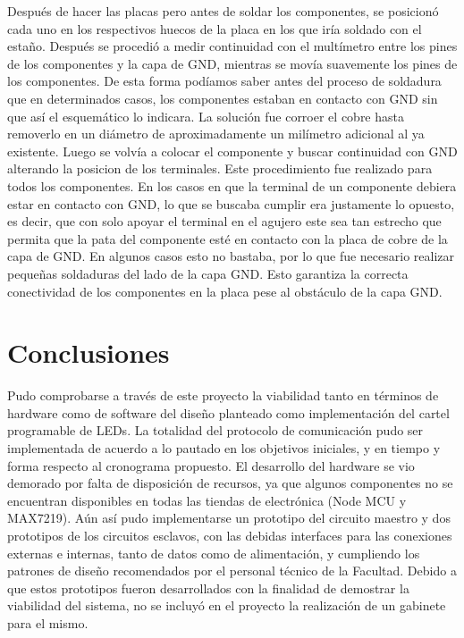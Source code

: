 Después de hacer las placas pero antes de soldar los componentes, se posicionó cada uno en los respectivos huecos de la placa en los que iría soldado con el estaño. Después se procedió a medir continuidad con el multímetro entre los pines de los componentes y la capa de GND, mientras se movía suavemente los pines de los componentes. De esta forma podíamos saber antes del proceso de soldadura que en determinados casos, los componentes estaban en contacto con GND sin que así el esquemático lo indicara. La solución fue corroer el cobre hasta removerlo en un diámetro de aproximadamente un milímetro adicional al ya existente. Luego se volvía a colocar el componente y buscar continuidad con GND alterando la posicion de los terminales. Este procedimiento fue realizado para todos los componentes. En los casos en que la terminal de un componente debiera estar en contacto con GND, lo que se buscaba cumplir era justamente lo opuesto, es decir, que con solo apoyar el terminal en el agujero este sea tan estrecho que permita que la pata del componente esté en contacto con la placa de cobre de la capa de GND. En algunos casos esto no bastaba, por lo que fue necesario realizar pequeñas soldaduras del lado de la capa GND. Esto garantiza la correcta conectividad de los componentes en la placa pese al obstáculo de la capa GND.

\section{Conclusiones}

Pudo comprobarse a través de este proyecto la viabilidad tanto en términos de hardware como de software del diseño planteado como implementación del cartel programable de LEDs. 
La totalidad del protocolo de comunicación pudo ser implementada de acuerdo a lo pautado en los objetivos iniciales, y en tiempo y forma respecto al cronograma propuesto. El desarrollo del hardware se vio demorado por falta de disposición de recursos, ya que algunos componentes no se encuentran disponibles en todas las tiendas de electrónica (Node MCU y MAX7219). Aún así pudo implementarse un prototipo del circuito maestro y dos prototipos de los circuitos esclavos, con las debidas interfaces para las conexiones externas e internas, tanto de datos como de alimentación, y cumpliendo los patrones de diseño recomendados por el personal técnico de la Facultad. Debido a que estos prototipos fueron desarrollados con la finalidad de demostrar la viabilidad del sistema, no se incluyó en el proyecto la realización de un gabinete para el mismo.

